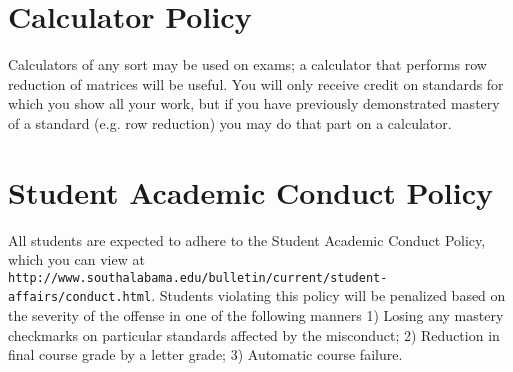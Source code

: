 \documentclass[letterpaper]{article}
\begin{document}
\section*{\fontsize{12}{15}\selectfont Calculator Policy}

Calculators of any sort may be used on exams; a calculator that performs row reduction of matrices will be useful.  You will only receive credit on standards for which you show all your work, but if you have previously demonstrated mastery of a standard (e.g. row reduction) you may do that part on a calculator. 

\section*{\fontsize{12}{15}\selectfont Student Academic Conduct Policy} 
All students are expected to adhere to the Student Academic Conduct Policy, which you can view at
{\tt http://www.southalabama.edu/bulletin/current/student-affairs/conduct.html}.  Students violating this policy will be penalized based on the severity of the offense in one of the following manners  1) Losing any mastery checkmarks on particular standards affected by the misconduct; 2) Reduction in final course grade by a letter grade; 3) Automatic course failure.
\end{document}
